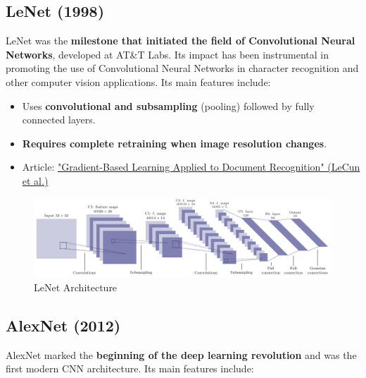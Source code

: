 \subsection{LeNet (1998)}
LeNet was the \textbf{milestone that initiated the field of Convolutional Neural Networks}, developed at AT\&T Labs. Its impact has been instrumental in promoting the use of Convolutional Neural Networks in character recognition and other computer vision applications. Its main features include:
\begin{itemize}
    \item Uses \textbf{convolutional and subsampling} (pooling) followed by fully connected layers.
    \item \textbf{Requires complete retraining when image resolution changes}.
    \item Article: \href{http://vision.stanford.edu/cs598_spring07/papers/Lecun98.pdf}{"Gradient-Based Learning Applied to Document Recognition" (LeCun et al.)}
\end{itemize}

\begin{figure}[!htbp]
    \centering
    \includegraphics[width=\textwidth]{tikz/chapter5 - LeNet.pdf}
    \caption{LeNet Architecture}
\end{figure}

\subsection{AlexNet (2012)}
AlexNet marked the \textbf{beginning of the deep learning revolution} and was the first modern CNN architecture. Its main features include:

